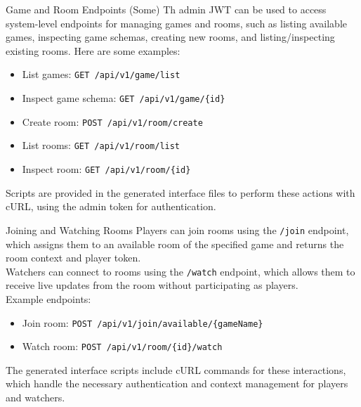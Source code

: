 \documentclass[aspectratio=169]{beamer}
\begin{document}
\begin{frame}{Game and Room Endpoints (Some)}
Th admin JWT can be used to access system-level endpoints for managing games and rooms, such as listing available games, 
inspecting game schemas, creating new rooms, and listing/inspecting existing rooms. Here are some examples: \\
\vspace{0.3cm}
\begin{itemize}
  \item List games: \texttt{GET /api/v1/game/list}
  \item Inspect game schema: \texttt{GET /api/v1/game/\{id\}}
  \item Create room: \texttt{POST /api/v1/room/create}
  \item List rooms: \texttt{GET /api/v1/room/list}
  \item Inspect room: \texttt{GET /api/v1/room/\{id\}}
\end{itemize}
\vspace{0.3cm}
Scripts are provided in the generated interface files to perform these actions with cURL, using the admin token for authentication.
\end{frame}

\begin{frame}{Joining and Watching Rooms}
Players can join rooms using the \texttt{/join} endpoint, which assigns them to an available room of the specified game and returns the room context and player token. \\
\vspace{0.3cm}
Watchers can connect to rooms using the \texttt{/watch} endpoint, which allows them to receive live updates from the room without participating as players. \\
\vspace{0.3cm}
Example endpoints:
\begin{itemize}
  \item Join room: \texttt{POST /api/v1/join/available/\{gameName\}}
  \item Watch room: \texttt{POST /api/v1/room/\{id\}/watch}
\end{itemize}
\vspace{0.3cm}
The generated interface scripts include cURL commands for these interactions, which handle the necessary authentication and context management for players and watchers.
\end{frame}
\end{document}
